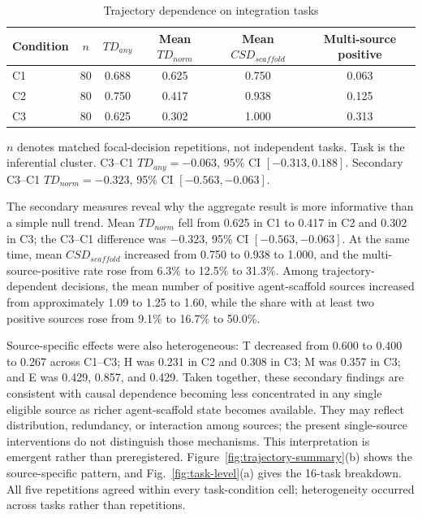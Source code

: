 \documentclass[conference]{IEEEtran}
\begin{document}
\begin{table}[t]
\caption{Trajectory dependence on integration tasks}
\label{tab:td}
\centering
\footnotesize
\begin{tabular}{lccccc}
\hline
\textbf{Condition} & \textbf{$n$} & \textbf{$TD_{any}$} & \textbf{Mean $TD_{norm}$} & \textbf{Mean $CSD_{scaffold}$} & \textbf{Multi-source positive}\\
\hline
C1 & 80 & 0.688 & 0.625 & 0.750 & 0.063\\
C2 & 80 & 0.750 & 0.417 & 0.938 & 0.125\\
C3 & 80 & 0.625 & 0.302 & 1.000 & 0.313\\
\hline
\end{tabular}
\vspace{1mm}
\parbox{0.95\textwidth}{\footnotesize $n$ denotes matched focal-decision repetitions, not independent tasks. Task is the inferential cluster. C3--C1 $TD_{any}=-0.063$, 95\% CI $[-0.313,0.188]$. Secondary C3--C1 $TD_{norm}=-0.323$, 95\% CI $[-0.563,-0.063]$.}
\end{table}

The secondary measures reveal why the aggregate result is more informative than a simple null trend. Mean $TD_{norm}$ fell from 0.625 in C1 to 0.417 in C2 and 0.302 in C3; the C3--C1 difference was $-0.323$, 95\% CI $[-0.563,-0.063]$. At the same time, mean $CSD_{scaffold}$ increased from 0.750 to 0.938 to 1.000, and the multi-source-positive rate rose from 6.3\% to 12.5\% to 31.3\%. Among trajectory-dependent decisions, the mean number of positive agent-scaffold sources increased from approximately 1.09 to 1.25 to 1.60, while the share with at least two positive sources rose from 9.1\% to 16.7\% to 50.0\%.

Source-specific effects were also heterogeneous: T decreased from 0.600 to 0.400 to 0.267 across C1--C3; H was 0.231 in C2 and 0.308 in C3; M was 0.357 in C3; and E was 0.429, 0.857, and 0.429. Taken together, these secondary findings are consistent with causal dependence becoming less concentrated in any single eligible source as richer agent-scaffold state becomes available. They may reflect distribution, redundancy, or interaction among sources; the present single-source interventions do not distinguish those mechanisms. This interpretation is emergent rather than preregistered. Figure~\ref{fig:trajectory-summary}(b) shows the source-specific pattern, and Fig.~\ref{fig:task-level}(a) gives the 16-task breakdown. All five repetitions agreed within every task-condition cell; heterogeneity occurred across tasks rather than repetitions.
\end{document}
